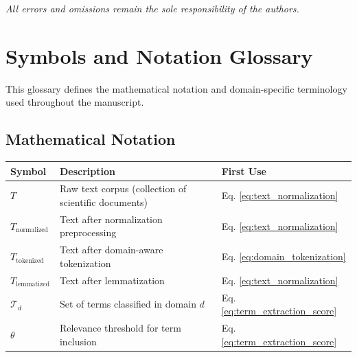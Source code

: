 \documentclass[
]{article}
\newcounter{none} %
\numberwithin{equation}{section}
\begin{document}
\emph{All errors and omissions remain the sole responsibility of the
authors.}

\newpage

\section{Symbols and Notation Glossary}\label{sec:glossary}

This glossary defines the mathematical notation and domain-specific
terminology used throughout the manuscript.

\subsection{Mathematical Notation}\label{mathematical-notation}

{\def\LTcaptype{none} %
\begin{longtable}[]{@{}
  >{\raggedright\arraybackslash}p{}
  >{\raggedright\arraybackslash}p{}
  >{\raggedright\arraybackslash}p{}@{}}
\toprule\noalign{}
\begin{minipage}[b]{\linewidth}\raggedright
Symbol
\end{minipage} & \begin{minipage}[b]{\linewidth}\raggedright
Description
\end{minipage} & \begin{minipage}[b]{\linewidth}\raggedright
First Use
\end{minipage} \\
\midrule\noalign{}
\endhead
\bottomrule\noalign{}
\endlastfoot
\(T\) & Raw text corpus (collection of scientific documents) & Eq.
\ref{eq:text_normalization} \\
\(T_{\text{normalized}}\) & Text after normalization preprocessing & Eq.
\ref{eq:text_normalization} \\
\(T_{\text{tokenized}}\) & Text after domain-aware tokenization & Eq.
\ref{eq:domain_tokenization} \\
\(T_{\text{lemmatized}}\) & Text after lemmatization & Eq.
\ref{eq:text_normalization} \\
\(\mathcal{T}_d\) & Set of terms classified in domain \(d\) & Eq.
\ref{eq:term_extraction_score} \\
\(\theta\) & Relevance threshold for term inclusion & Eq.
\ref{eq:term_extraction_score} \\

\end{longtable}}
\end{document}

